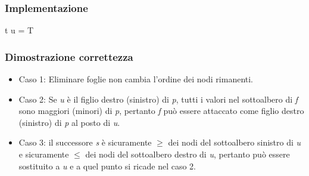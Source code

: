 \subsubsection{Implementazione}
\begin{algorithm}[H]
\DontPrintSemicolon
{}
\caption{\protect\Tree \protect{}}

\Tree t\;
\Tree u = \;
\Return T\;


\end{algorithm}
\subsubsection{Dimostrazione correttezza}
\begin{itemize}
\item Caso 1: Eliminare foglie non cambia l'ordine dei nodi rimanenti.
\item Caso 2: Se \emph{u} \`e il figlio destro (sinistro) di \emph{p}, tutti i valori nel sottoalbero di \emph{f} sono maggiori (minori) di \emph{p}, 
pertanto \emph{f} pu\`o essere attaccato come figlio destro (sinistro) di \emph{p} al posto di \emph{u}.
\item Caso 3: il successore \emph{s} \`e sicuramente $\ge$ dei nodi del sottoalbero sinistro di \emph{u} e sicuramente $\le$ dei nodi del sottoalbero destro 
di \emph{u}, pertanto pu\`o essere sostituito a \emph{u} e a quel punto si ricade nel caso 2.
\end{itemize}
